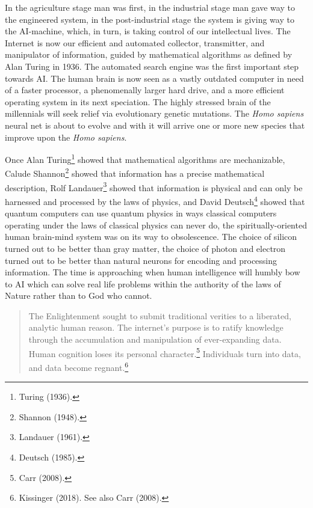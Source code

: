 \begin{multicols}{2}
\vskip 3pt

In the agriculture stage man was first, in the industrial stage man gave way to the engineered system, in the post-industrial stage the system is giving way to the AI-machine, which, in turn, is taking control of our intellectual lives. The Internet is now our efficient and automated collector, transmitter, and manipulator of information, guided by mathematical algorithms as defined by Alan Turing in 1936. The automated search engine was the first important step towards AI. The human brain is now seen
as a vastly outdated computer in need of a faster processor, a phenomenally larger hard drive, and a more efficient operating system in its next speciation. The highly stressed brain of the millennials will seek relief via evolutionary genetic mutations. The \textit{Homo sapiens} neural net is about to evolve and with it will arrive one or more new species that improve upon the \textit{Homo sapiens}.

\vskip 3pt

Once Alan Turing\footnote{Turing (1936).} showed that mathematical algorithms are mechanizable, Calude Shannon\footnote{Shannon (1948).} showed that information has a precise mathematical description, Rolf Landauer\footnote{Landauer (1961).}  showed that information is physical and can only be harnessed and processed by the laws of physics, and David Deutsch\footnote{Deutsch (1985).}  showed that quantum computers can use quantum physics in ways classical computers operating under the laws of classical physics can never do, the spiritually-oriented human brain-mind system was on its way to obsolescence. The choice of silicon turned out to be better than gray matter, the choice of photon and electron turned out to be better than natural neurons for encoding and processing information. The time is approaching when human intelligence will humbly bow to AI which can solve real life problems within the authority of the laws of Nature rather than to God who cannot.

\begin{quote}
The Enlightenment sought to submit traditional verities to a liberated, analytic human reason. The internet's purpose is to ratify knowledge through the accumulation and manipulation of ever-expanding data. Human cognition loses its personal character.\footnote{Carr (2008).} Individuals turn into data, and data become regnant.\footnote{Kissinger (2018). See also Carr (2008).}
\end{quote}

\newpage


\end{multicols}
